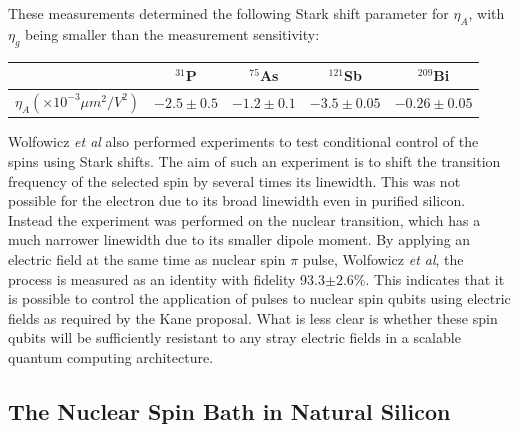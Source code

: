 These measurements determined the following Stark shift parameter for $\eta_A$, with $\eta_g$ being smaller than the measurement sensitivity:

\begin{center}
\begin{tabular}{||c || c | c | c | c||}
\hline
& $^{31}$P & $^{75}$As & $^{121}$Sb & $^{209}$Bi \\
\hline
$\eta_A (\times 10^{-3} \mu m^2 / V^2)$ & $-2.5\pm 0.5$ & $-1.2 \pm 0.1$ & $-3.5 \pm 0.05$ & $-0.26\pm0.05$\\
\hline
\end{tabular}
\end{center}

Wolfowicz \emph{et al} also performed experiments to test conditional control of the spins using Stark shifts.
The aim of such an experiment is to shift the transition frequency of the selected spin by several times its linewidth.
This was not possible for the electron due to its broad linewidth even in purified silicon.
Instead the experiment was performed on the nuclear transition, which has a much narrower linewidth due to its smaller dipole moment.
By applying an electric field at the same time as nuclear spin $\pi$ pulse, Wolfowicz \emph{et al}, the process is measured as an identity with fidelity 93.3$\pm2.6\%$.
This indicates that it is possible to control the application of pulses to nuclear spin qubits using electric fields as required by the Kane proposal.
What is less clear is whether these spin qubits will be sufficiently resistant to any stray electric fields in a scalable quantum computing architecture. 

\subsection{The Nuclear Spin Bath in Natural Silicon}


